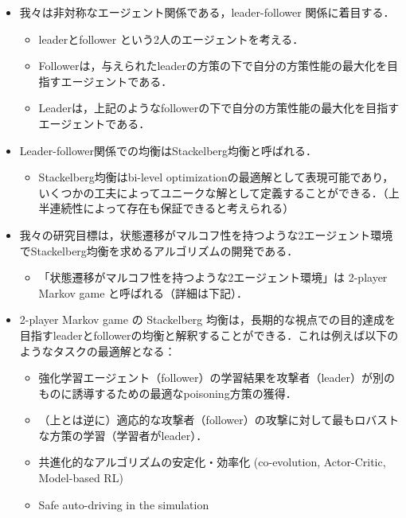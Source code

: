\documentclass[a4paper,10pt,dvipdfmx]{jsarticle}
\begin{document}
\begin{itemize}
\begin{itemize}
    \end{itemize}
    \item 我々は非対称なエージェント関係である，leader-follower 関係に着目する．
    \begin{itemize}
        \item leaderとfollower という2人のエージェントを考える．
        \item Followerは，与えられたleaderの方策の下で自分の方策性能の最大化を目指すエージェントである．
        \item Leaderは，上記のようなfollowerの下で自分の方策性能の最大化を目指すエージェントである．
    \end{itemize}
    \item Leader-follower関係での均衡はStackelberg均衡と呼ばれる．
    \begin{itemize}
        \item Stackelberg均衡はbi-level optimizationの最適解として表現可能であり，いくつかの工夫によってユニークな解として定義することができる．（上半連続性によって存在も保証できると考えられる）
    \end{itemize}
    \item 我々の研究目標は，状態遷移がマルコフ性を持つような2エージェント環境でStackelberg均衡を求めるアルゴリズムの開発である．
    \begin{itemize}
        \item 「状態遷移がマルコフ性を持つような2エージェント環境」は 2-player Markov game と呼ばれる（詳細は下記）．
    \end{itemize}
    \item 2-player Markov game の Stackelberg 均衡は，長期的な視点での目的達成を目指すleaderとfollowerの均衡と解釈することができる．これは例えば以下のようなタスクの最適解となる：
    \begin{itemize}
        \item 強化学習エージェント（follower）の学習結果を攻撃者（leader）が別のものに誘導するための最適なpoisoning方策の獲得．
        \item （上とは逆に）適応的な攻撃者（follower）の攻撃に対して最もロバストな方策の学習（学習者がleader）．
        \item 共進化的なアルゴリズムの安定化・効率化 (co-evolution\cite{Yang2023-tf}, Actor-Critic\cite{Zheng2022-xj}, Model-based RL\cite{Rajeswaran-ym})
        \item Safe auto-driving in the simulation\cite{Zhang2020-hw,Zheng2024-in}

\end{itemize}
\end{itemize}
\end{document}

